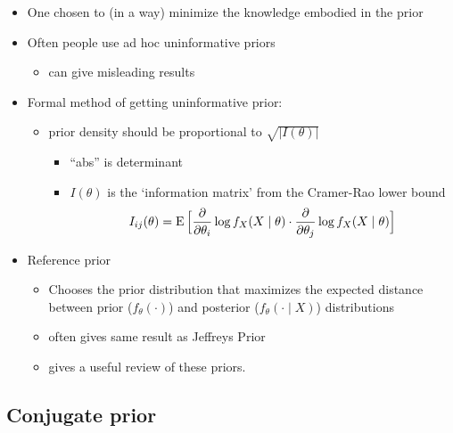 \begin{itemize}
\item One chosen to (in a way) minimize the knowledge embodied in
       the prior
\item Often people use ad hoc uninformative priors
\begin{itemize}
\item can give misleading results
\end{itemize}
\item Formal method of getting uninformative prior:
\begin{itemize}
\item prior density should be proportional to $\sqrt{|I(\theta)|}$
\begin{itemize}
\item ``abs'' is determinant
\item $I(\theta)$ is the `information matrix' from the Cramer-Rao lower bound
  \[I_{ij}(\theta) = \operatorname{E}\Big[ \frac{\partial}{\partial \theta_i} \log f_X(X \mid \theta) \cdot \frac{\partial}{\partial \theta_j}
  \log f_X(X \mid \theta) \Big]\]
\end{itemize}
\end{itemize}
\item Reference prior
\begin{itemize}
\item Chooses the prior distribution that maximizes the expected
  distance between prior ($f_\theta(\cdot)$) and posterior ($f_\theta(\cdot \mid X)$)
  distributions
\item often gives same result as Jeffreys Prior
\item \citet{Ber05} gives a useful review of these priors.
\end{itemize}
\end{itemize}

\subsection{Conjugate prior}

